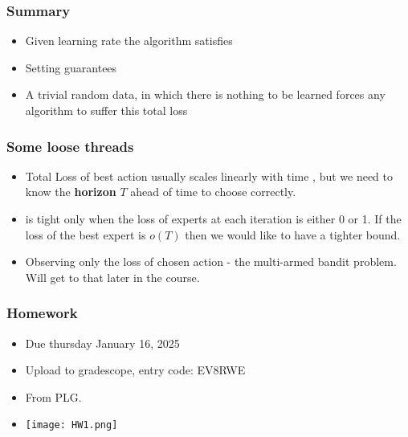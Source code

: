 \documentclass[handout]{beamer}
\begin{document}
\begin{frame}
\frametitle{Summary}
\begin{itemize}
\item Given learning rate \R{$\eta$} the \ouralg algorithm satisfies
\item Setting  guarantees
\item
A trivial random data, in which there is nothing to be learned forces
\alert{any} algorithm to suffer this total loss
\end{itemize}
\end{frame}

\begin{frame}
\frametitle{Some loose threads}
\begin{itemize}
\item Total Loss of best action usually scales linearly with time
  , but we need to know the {\bf horizon} $T$ ahead of time to
  choose \R{$\eta$} correctly.
  \item {} is tight only when the loss of experts at each iteration is
    either 0 or 1. If the loss of the best expert is $o(T)$ then we
    would like to have a tighter bound.
\item Observing only the loss of chosen action - the multi-armed
  bandit problem. Will get to that later in the course.
\end{itemize}
\end{frame}


\begin{frame}
\frametitle{Homework}
\begin{itemize}
\item
  Due thursday January 16, 2025
\item
  Upload to gradescope, entry code: EV8RWE
\item
  From PLG.
\item
\texttt{[image: HW1.png]}
\end{itemize}
\end{frame}
\end{document}
